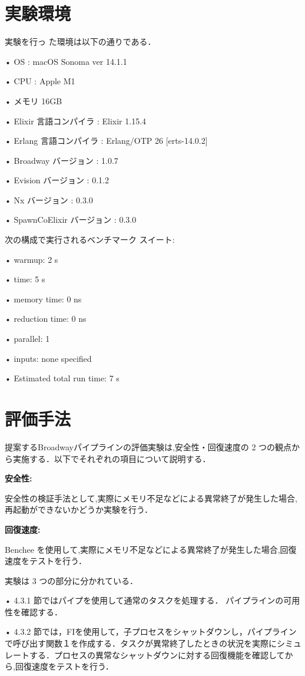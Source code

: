 \documentclass[a4paper]{jreport}	%
\begin{document}
\section{実験環境}
実験を行っ た環境は以下の通りである．

• OS : macOS Sonoma ver 14.1.1 

• CPU : Apple M1

• メモリ 16GB 

• Elixir 言語コンパイラ : Elixir 1.15.4

• Erlang 言語コンパイラ : Erlang/OTP 26 [erts-14.0.2]

• Broadway バージョン :  1.0.7

• Evision バージョン :  0.1.2

• Nx バージョン :  0.3.0

• SpawnCoElixir バージョン :  0.3.0

次の構成で実行されるベンチマーク スイート:

• warmup: 2 s

• time: 5 s

• memory time: 0 ns

• reduction time: 0 ns

• parallel: 1

• inputs: none specified

• Estimated total run time: 7 s

\section{評価手法}
提案するBroadwayパイプラインの評価実験は,安全性・回復速度の 2 つの観点から実施する．以下でそれぞれの項目について説明する．

\textbf{安全性:}

安全性の検証手法として,実際にメモリ不足などによる異常終了が発生した場合,再起動ができないかどうか実験を行う．

\textbf{回復速度:} 

Benchee を使用して,実際にメモリ不足などによる異常終了が発生した場合,回復速度をテストを行う．

実験は 3 つの部分に分かれている．

• 4.3.1 節ではパイプを使用して通常のタスクを処理する． パイプラインの可用性を確認する．

• 4.3.2 節では，FIを使用して，子プロセスをシャットダウンし，パイプラインで呼び出す関数１を作成する．タスクが異常終了したときの状況を実際にシミュレートする．プロセスの異常なシャットダウンに対する回復機能を確認してから,回復速度をテストを行う．
\end{document}
